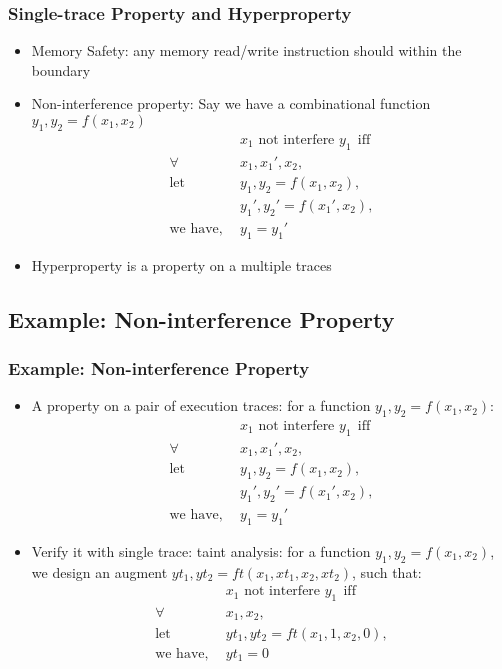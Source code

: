 \documentclass{beamer}
\begin{document}
\begin{frame}
\frametitle{Single-trace Property and Hyperproperty}
\begin{itemize}
  \item<1-> Memory Safety: any memory read/write instruction should within the boundary
  \item<2-> Non-interference property: Say we have a combinational function $y_1, y_2 = f(x_1, x_2)$
  \begin{align*}
    & \text{$x_1$ not interfere $y_1$} ~~ \text{iff} \\
    \forall ~~& x_1, x_1', x_2, \\
    \text{let} ~~& y_1, y_2 = f(x_1, x_2), \\
    ~~~~~~& y_1', y_2' = f(x_1', x_2), \\
    \text{we have}, ~~& y_1 = y_1'
  \end{align*}
  \item<3-> Hyperproperty is a property on a multiple traces
\end{itemize}
\end{frame}



\subsection{Example: Non-interference Property}

\begin{frame}
\frametitle{Example: Non-interference Property}
\begin{itemize}
  \item<1-> A property on a pair of execution traces: for a function $y_1, y_2 = f(x_1, x_2)$:
  \begin{align*}
    & \text{$x_1$ not interfere $y_1$} ~~ \text{iff} \\
    \forall ~~& x_1, x_1', x_2, \\
    \text{let} ~~& y_1, y_2 = f(x_1, x_2), \\
    ~~~~~~& y_1', y_2' = f(x_1', x_2), \\
    \text{we have}, ~~& y_1 = y_1'
  \end{align*}
  \item<2-> Verify it with single trace: taint analysis: for a function $y_1, y_2 = f(x_1, x_2)$, we design an augment $yt_1, yt_2 = ft(x_1, xt_1, x_2, xt_2)$, such that:
  \begin{align*}
    & \text{$x_1$ not interfere $y_1$} ~~ \text{iff} \\
    \forall ~~& x_1, x_2, \\
    \text{let} ~~& yt_1, yt_2 = ft(x_1, 1, x_2, 0), \\
    \text{we have}, ~~& yt_1 = 0
  \end{align*}
\end{itemize}
\end{frame}
\end{document}
